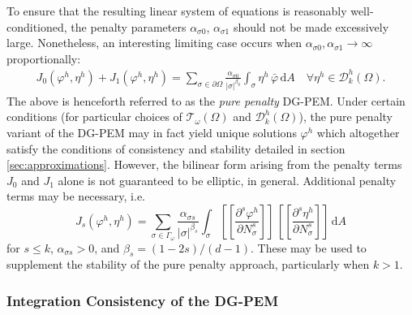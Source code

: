 	To ensure that the resulting linear system of equations is reasonably well-conditioned, the penalty parameters $\alpha_{\sigma0}$, $\alpha_{\sigma1}$ should not be made excessively large. Nonetheless, an interesting limiting case occurs when $\alpha_{\sigma0}, \alpha_{\sigma1} \rightarrow \infty$ proportionally:
	\begin{eqnarray}
		J_0 (\varphi^h,\eta^h) + J_1 (\varphi^h,\eta^h) = \sum_{\sigma \in \partial \Omega} \frac{\alpha_{\sigma0}}{|\sigma|^{\beta_0}} \int_{\sigma} \eta^h \,  \bar{\varphi} \, \mathrm dA \quad \forall \eta^h \in \mathcal{D}^h_k (\Omega).
		\label{eq:pure_penalty}
	\end{eqnarray}
	The above is henceforth referred to as the \textit{pure penalty} DG-PEM. Under certain conditions (for particular choices of $\mathcal{T}_\omega (\Omega)$ and $\mathcal{D}^h_k (\Omega)$), the pure penalty variant of the DG-PEM may in fact yield unique solutions $\varphi^h$ which altogether satisfy the conditions of consistency and stability detailed in section \ref{sec:approximations}. However, the bilinear form arising from the penalty terms $J_0$ and $J_1$ alone is not guaranteed to be elliptic, in general. Additional penalty terms may be necessary, i.e.
	\begin{equation}
		J_s (\varphi^h,\eta^h) = \sum_{\sigma \in \Gamma_\omega} \frac{\alpha_{\sigma s}}{|\sigma|^{\beta_s}} \int_{\sigma} \left[\!\!\left[ \frac{\partial^s \varphi^h}{\partial N^s_{\sigma}} \right]\!\!\right] \, \left[\!\!\left[ \frac{\partial^s \eta^h}{\partial N^s_{\sigma}} \right]\!\!\right] \, \mathrm dA
		\label{eq:flux_penalty}
	\end{equation}
	for $s \leq k$, $\alpha_{\sigma s} > 0$, and $\beta_s = (1-2s)/(d-1)$. These may be used to supplement the stability of the pure penalty approach, particularly when $k > 1$.
	
\subsubsection*{Integration Consistency of the DG-PEM}

